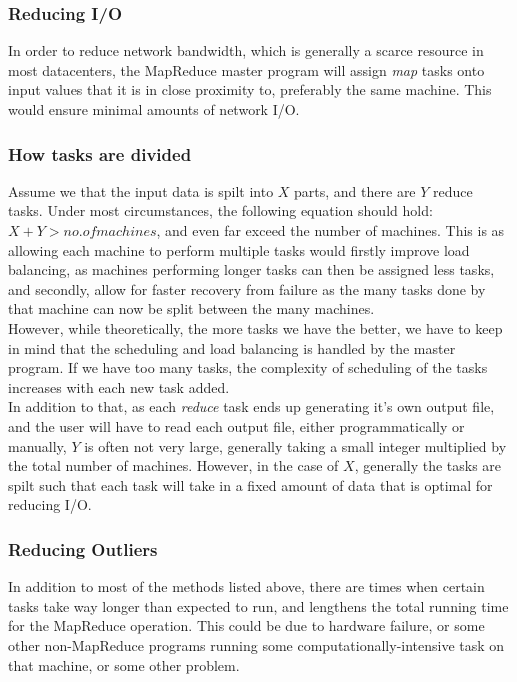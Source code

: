 \documentclass[]{article}
\begin{document}
\subsubsection{Reducing I/O}
In order to reduce network bandwidth, which is generally a scarce resource in most datacenters, the MapReduce master program will assign \emph{map} tasks onto input values that it is in close proximity to, preferably the same machine. This would ensure minimal amounts of network I/O. \\ 

\subsubsection{How tasks are divided}
Assume we that the input data is spilt into $X$ parts, and there are $Y$ reduce tasks. Under most circumstances, the following equation should hold: $X + Y > no. of machines$, and even far exceed the number of machines. This is as allowing each machine to perform multiple tasks would firstly improve load balancing, as machines performing longer tasks can then be assigned less tasks, and secondly, allow for faster recovery from failure as the many tasks done by that machine can now be split between the many machines.\\

However, while theoretically, the more tasks we have the better, we have to keep in mind that the scheduling and load balancing is handled by the master program. If we have too many tasks, the complexity of scheduling of the tasks increases with each new task added. \\

In addition to that, as each \emph{reduce} task ends up generating it's own output file, and the user will have to read each output file, either programmatically or manually, $Y$ is often not very large, generally taking a small integer multiplied by the total number of machines. However, in the case of $X$, generally the tasks are spilt such that each task will take in a fixed amount of data that is optimal for reducing I/O.\\

\subsubsection{Reducing Outliers}
In addition to most of the methods listed above, there are times when certain tasks take way longer than expected to run, and lengthens the total running time for the MapReduce operation. This could be due to hardware failure, or some other non-MapReduce programs running some computationally-intensive task on that machine, or some other problem. \\
\end{document}
